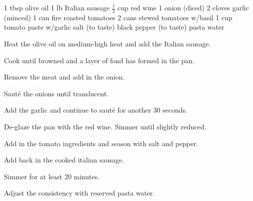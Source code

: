 \dishtype{\sauce}
\dishother{}
\begin{ingreds}
    1 tbsp olive oil
    1 lb Italian sausage
    $\frac{1}{2}$ cup red wine
    1 onion (diced)
    2 cloves garlic (minced)
    1 can fire roasted tomatoes
    2 cans stewed tomatoes w/basil
    1 cup tomato paste w/garlic
    salt (to taste)
    black pepper (to taste)
    pasta water
\end{ingreds}
\begin{method}
    Heat the olive oil on medium-high heat and add the Italian sausage.\par
    Cook until browned and a layer of fond has formed in the pan.\par
    Remove the meat and add in the onion.\par
    Saut\'e the onions until translucent.\par
    Add the garlic and continue to saut\'e for another 30 seconds.\par
    De-glaze the pan with the red wine. Simmer until slightly reduced.\par
    Add in the tomato ingredients and season with salt and pepper.\par
    Add back in the cooked italian sausage.\par
    Simmer for at least 20 minutes.\par
    Adjust the consistency with reserved pasta water.
\end{method}